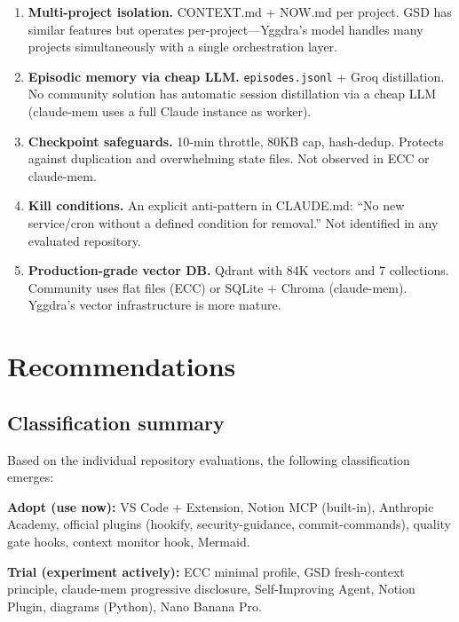 \documentclass[11pt,a4paper]{article}
\begin{document}
\begin{enumerate}
  \item \textbf{Multi-project isolation.} CONTEXT.md + NOW.md per project. GSD has similar features but operates per-project---Yggdra's model handles many projects simultaneously with a single orchestration layer.

  \item \textbf{Episodic memory via cheap LLM.} \texttt{episodes.jsonl} + Groq distillation. No community solution has automatic session distillation via a cheap LLM (claude-mem uses a full Claude instance as worker).

  \item \textbf{Checkpoint safeguards.} 10-min throttle, 80KB cap, hash-dedup. Protects against duplication and overwhelming state files. Not observed in ECC or claude-mem.

  \item \textbf{Kill conditions.} An explicit anti-pattern in CLAUDE.md: ``No new service/cron without a defined condition for removal.'' Not identified in any evaluated repository.

  \item \textbf{Production-grade vector DB.} Qdrant with 84K vectors and 7 collections. Community uses flat files (ECC) or SQLite + Chroma (claude-mem). Yggdra's vector infrastructure is more mature.
\end{enumerate}

\newpage

\section{Recommendations}

\subsection{Classification summary}

Based on the individual repository evaluations, the following classification emerges:

\textbf{Adopt (use now):} VS Code + Extension, Notion MCP (built-in), Anthropic Academy, official plugins (hookify, security-guidance, commit-commands), quality gate hooks, context monitor hook, Mermaid.

\textbf{Trial (experiment actively):} ECC minimal profile, GSD fresh-context principle, claude-mem progressive disclosure, Self-Improving Agent, Notion Plugin, diagrams (Python), Nano Banana Pro.
\end{document}
